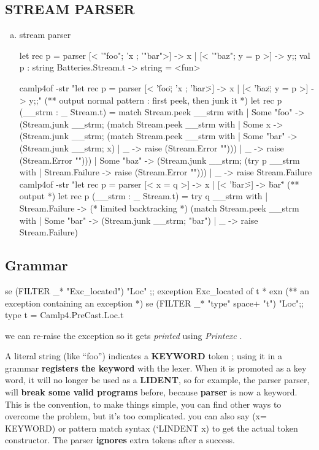 \subsection{STREAM PARSER}
  \begin{enumerate}[(a)]
  \item stream parser

\begin{alternate}
let rec p = parser [< '"foo"; 'x ; '"bar">] -> x | [< '"baz"; y = p >] -> y;;
val p : string Batteries.Stream.t -> string = <fun>
\end{alternate}

\begin{redcode}
camlp4of  -str "let rec p = parser [< '\"foo\"; 'x ; '\"bar\">] -> x | [< '\"baz\"; y = p >] -> y;;"
(** output 
   normal pattern : first peek, then junk it 
*)
let rec p (__strm : _ Stream.t) =
  match Stream.peek __strm with
  | Some "foo" ->
      (Stream.junk __strm;
       (match Stream.peek __strm with
        | Some x ->
            (Stream.junk __strm;
             (match Stream.peek __strm with
              | Some "bar" -> (Stream.junk __strm; x)
              | _ -> raise (Stream.Error "")))
        | _ -> raise (Stream.Error "")))
  | Some "baz" ->
      (Stream.junk __strm;
       (try p __strm with | Stream.Failure -> raise (Stream.Error "")))
  | _ -> raise Stream.Failure
camlp4of -str "let rec p = parser [< x = q >] -> x | [< '\"bar\">] -> \"bar\""
(** output  *)
let rec p (__strm : _ Stream.t) =
  try q __strm
  with
  | Stream.Failure -> (* limited backtracking *)
      (match Stream.peek __strm with
       | Some "bar" -> (Stream.junk __strm; "bar")
       | _ -> raise Stream.Failure)
\end{redcode}
  \end{enumerate}

\subsection{Grammar}


\begin{bluecode}
se (FILTER _* "Exc_located") "Loc" ;;
exception Exc_located of t * exn 
(** an exception containing an exception *)
se (FILTER _* "type" space+ "t") "Loc";; 
type t = Camlp4.PreCast.Loc.t
\end{bluecode}

we can re-raise the exception so it gets \textit{printed} using
\textit{Printexc} .

A literal string (like ``foo'') indicates a \textbf{KEYWORD} token ;
using it in a grammar \textbf{registers the keyword} with the lexer. When
it is promoted as a key word, it will no longer be used as a \textbf{
  LIDENT}, so for example, the parser parser, will \textbf{break some valid
programs} before, because \textbf{parser} is now a keyword. This is the
convention, to make things simple, you can find other ways to overcome
the problem, but it's too complicated. you can also say (x= KEYWORD)
or pattern match syntax (`LINDENT x) to get the actual token
constructor. The parser \textbf{ignores} extra tokens after a success.



